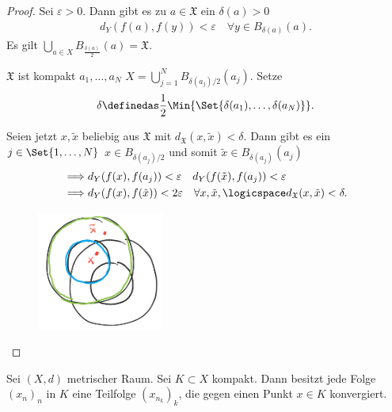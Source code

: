 \begin{proof}
    Sei \( \varepsilon>0 \). Dann gibt es zu \( a\in \mathfrak{X} \) ein \( \delta(a)>0 \) \sd
    \begin{align*}
        d_Y(f(a),f(y))<\varepsilon\quad \forall y\in B_{\delta(a)}(a).
    \end{align*}
    Es gilt \( \bigcup_{a\in X} B_{\frac{\delta(a)}{2}}(a)=\mathfrak{X}\).

    \( \mathfrak{X} \) ist kompakt \timplies \texists \( a_1,\ldots,a_N \) \sd \( X=\bigcup\limits_{j=1}^{N}B_{\delta(a_j)/2} (a_j)\). Setze 
    \begin{align*}
        \delta\definedas \frac{1}{2}\Min{\Set{\delta(a_1),\ldots,\delta(a_N)}}.
    \end{align*}

    Seien jetzt \( x,\tilde{x} \) beliebig aus \( \mathfrak{X} \) mit \( d_{\mathfrak{X}}(x,\tilde{x})<\delta \). Dann gibt es ein \( j\in \Set{1,\ldots, N} \) \sd \( x\in B_{\delta(a_j)/2} \) und somit \( \tilde{x}\in B_{\delta(a_j)}(a_j) \)
    \begin{align*}
        \implies &d_Y(f(x),f(a_j))<\varepsilon \quad d_Y(f(\tilde{x}),f(a_j))<\varepsilon\\
        \implies &d_Y(f(x),f(\tilde{x}))<2\varepsilon \quad \forall x,\tilde{x},\logicspace d_{\mathfrak{X}}(x,\tilde{x})<\delta.
    \end{align*}
    \begin{figure}[H]
        \centering
        \includegraphics[width=0.4\linewidth]{figures/doppel_doppel_ball}
        \label{fig:doppel_doppel_ball}
    \end{figure}
    
\end{proof}
\begin{satz}\label{bolzanoweierstrass}
    Sei \( (X,d) \) metrischer Raum. Sei \( K\subset X \) kompakt. Dann besitzt jede Folge \( (x_n)_n \) in \( K \) eine Teilfolge \( (x_{n_k})_k \), die gegen einen Punkt \( x\in K \) konvergiert. 
\end{satz}
